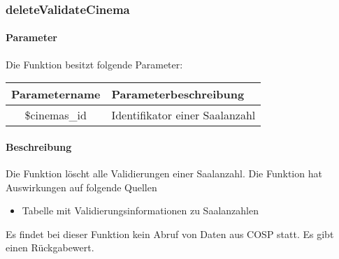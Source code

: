 \subsubsection{deleteValidateCinema}
\paragraph{Parameter} Die Funktion besitzt folgende Parameter:
\begin{table}[H]
	\begin{tabular}{|c|p{11cm}|}
		\hline
		\textbf{Parametername} & \textbf{Parameterbeschreibung} \\ \hline
		\$cinemas\_id & Identifikator einer Saalanzahl \\ \hline
	\end{tabular}
\end{table}
\paragraph{Beschreibung} Die Funktion löscht alle Validierungen einer Saalanzahl. Die Funktion hat Auswirkungen auf folgende Quellen
\begin{itemize}
	\item Tabelle mit Validierungsinformationen zu Saalanzahlen
\end{itemize}
Es findet bei dieser Funktion kein Abruf von Daten aus {\glqq COSP\grqq} statt. Es gibt einen Rückgabewert.